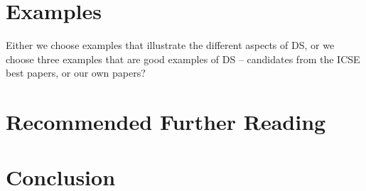 \documentclass[graybox]{svmult}
\begin{document}
\cite{CarverIEEESW2018}

\section{Examples}
Either we choose examples that illustrate the different aspects of DS, or we choose three examples that are good examples of DS -- candidates from the ICSE best papers, or our own papers?



\section{Recommended Further Reading}

\section{Conclusion}





\end{document}
